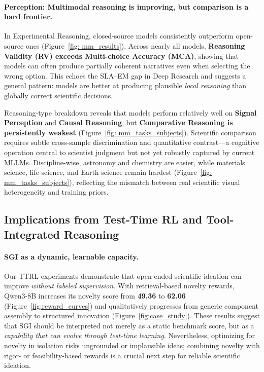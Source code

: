 \paragraph{Perception: Multimodal reasoning is improving, but comparison is a hard frontier.}
In Experimental Reasoning, closed-source models consistently outperform open-source ones (Figure~\ref{fig: mm_results}). Across nearly all models, \textbf{Reasoning Validity (RV) exceeds Multi-choice Accuracy (MCA)}, showing that models can often produce partially coherent narratives even when selecting the wrong option. This echoes the SLA--EM gap in Deep Research and suggests a general pattern: models are better at producing plausible \emph{local reasoning} than globally correct scientific decisions.

Reasoning-type breakdown reveals that models perform relatively well on \textbf{Signal Perception} and \textbf{Causal Reasoning}, but \textbf{Comparative Reasoning is persistently weakest} (Figure~\ref{fig: mm_tasks_subjects}). Scientific comparison requires subtle cross-sample discrimination and quantitative contrast---a cognitive operation central to scientist judgment but not yet robustly captured by current MLLMs. Discipline-wise, astronomy and chemistry are easier, while materials science, life science, and Earth science remain hardest (Figure~\ref{fig: mm_tasks_subjects}), reflecting the mismatch between real scientific visual heterogeneity and training priors.


\subsection{Implications from Test-Time RL and Tool-Integrated Reasoning}
\paragraph{SGI as a dynamic, learnable capacity.}
Our TTRL experiments demonstrate that open-ended scientific ideation can improve \emph{without labeled supervision}. With retrieval-based novelty rewards, Qwen3-8B increases its novelty score from \textbf{49.36} to \textbf{62.06} (Figure~\ref{fig:reward_curves}) and qualitatively progresses from generic component assembly to structured innovation (Figure~\ref{fig:case_study}). These results suggest that SGI should be interpreted not merely as a static benchmark score, but as a \emph{capability that can evolve through test-time learning}. Nevertheless, optimizing for novelty in isolation risks ungrounded or implausible ideas; combining novelty with rigor- or feasibility-based rewards is a crucial next step for reliable scientific ideation.

